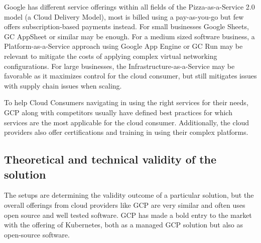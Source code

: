 \documentclass[11pt]{article}
\begin{document}
Google has different service offerings within all fields of the Pizza-as-a-Service 2.0  model (a Cloud Delivery Model), most is billed using a pay-as-you-go but few offers subscription-based payments instead. For small businesses Google Sheets, GC AppSheet or similar may be enough. For a medium sized software business, a Platform-as-a-Service approach using Google App Engine or GC Run may be relevant to mitigate the costs of applying complex virtual networking configurations. For large businesses, the Infrastructure-as-a-Service may be favorable as it maximizes control for the cloud consumer, but still mitigates issues with supply chain issues when scaling.

To help Cloud Consumers navigating in using the right services for their needs, GCP along with competitors usually have defined best practices for which services are the most applicable for the cloud consumer. Additionally, the cloud providers also offer certifications and training in using their complex platforms.

\subsection*{Theoretical and technical validity of the solution}
The setups are determining the validity outcome of a particular solution, but the overall offerings from cloud providers like GCP are very similar and often uses open source and well tested software. GCP has made a bold entry to the market with the offering of Kubernetes, both as a managed GCP solution but also as open-source software.
\end{document}
